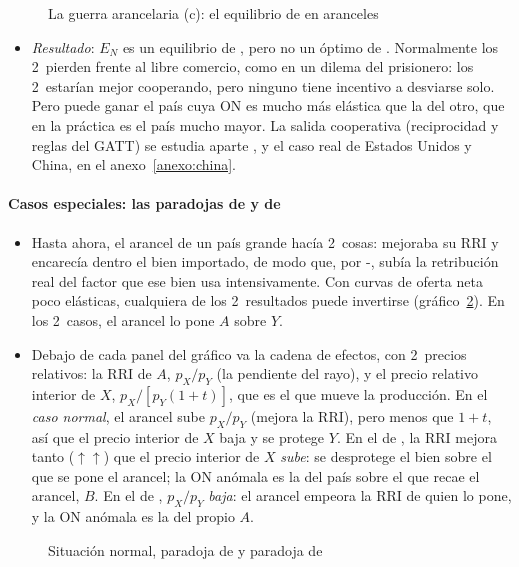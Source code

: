 \documentclass[11pt]{article}
\begin{document}
\begin{figure}[H]
\centering
\caption{La guerra arancelaria (c): el equilibrio de  en aranceles}\label{fig:johnson}
\end{figure}
\begin{itemize}
\item \emph{Resultado}: $E_N$ es un equilibrio de , pero no un óptimo de . Normalmente los 2~pierden frente al libre comercio, como en un dilema del prisionero: los 2~estarían mejor cooperando, pero ninguno tiene incentivo a desviarse solo. Pero puede ganar el país cuya ON es mucho más elástica que la del otro, que en la práctica es el país mucho mayor\nocite{KennanRiezman1988Big}. La salida cooperativa (reciprocidad y reglas del GATT) se estudia aparte , y el caso real de Estados Unidos y China, en el anexo~\ref{anexo:china}.
\end{itemize}

\paragraph{Casos especiales: las paradojas de  y de }

\begin{itemize}
\item Hasta ahora, el arancel de un país grande hacía 2~cosas: mejoraba su RRI y encarecía dentro el bien importado, de modo que, por -, subía la retribución real del factor que ese bien usa intensivamente. Con curvas de oferta neta poco elásticas, cualquiera de los 2~resultados puede invertirse (gráfico~\ref{fig:metzler-lerner}). En los 2~casos, el arancel lo pone $A$ sobre $Y$.
\item Debajo de cada panel del gráfico va la cadena de efectos, con 2~precios relativos: la RRI de $A$, $p_X/p_Y$ (la pendiente del rayo), y el precio relativo interior de $X$, $p_X/[p_Y(1+t)]$, que es el que mueve la producción. En el \emph{caso normal}, el arancel sube $p_X/p_Y$ (mejora la RRI), pero menos que $1+t$, así que el precio interior de $X$ baja y se protege $Y$. En el de , la RRI mejora tanto ($\uparrow\uparrow$) que el precio interior de $X$ \emph{sube}: se desprotege el bien sobre el que se pone el arancel; la ON anómala es la del país sobre el que recae el arancel, $B$. En el de , $p_X/p_Y$ \emph{baja}: el arancel empeora la RRI de quien lo pone, y la ON anómala es la del propio $A$.
\end{itemize}
\begin{figure}[H]
\centering
\caption{Situación normal, paradoja de  y paradoja de }\label{fig:metzler-lerner}
\end{figure}
\end{document}
